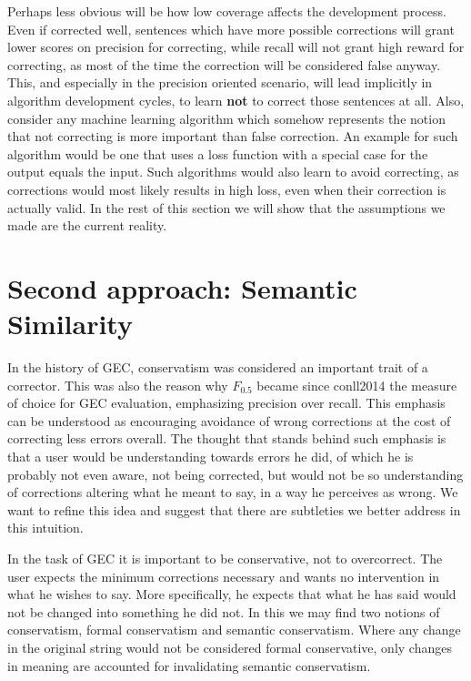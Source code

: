 \documentclass[english]{article}
\begin{document}
Perhaps less obvious will be how low coverage affects the development
process. Even if corrected well, sentences which have more possible
corrections will grant lower scores on precision for correcting, while recall will not grant high reward for correcting, as most of the time the correction will be considered false anyway. This, and especially in the precision oriented scenario, will lead implicitly in algorithm development cycles, to learn \textbf{not} to correct those sentences at all. Also, consider any machine learning algorithm which somehow represents the notion that not correcting is more important than false correction. An example for such algorithm would be one that uses a loss function with a special case for the output equals the input. Such algorithms would also learn to avoid correcting, as corrections would most likely results in high loss, even when their correction is actually valid.
In the rest of this section we will show that the assumptions we made are the current reality. 


\section{Second approach: Semantic Similarity\label{sec:Semantics}}

In the history of GEC, conservatism was considered an
important trait of a corrector\cite{brockett2006correcting}.
This was also the reason why $F_{0.5}$ became since conll2014\cite{ng2014conll}
the measure of choice for GEC evaluation, emphasizing
precision over recall. This emphasis can be understood as encouraging
avoidance of wrong corrections at the cost of correcting less errors
overall. The thought that stands behind such emphasis is that a user
would be understanding towards errors he did, of which he is probably
not even aware, not being corrected, but would not be so understanding
of corrections altering what he meant to say, in a way he perceives as wrong. We want to refine
this idea and suggest that there are subtleties we better address
in this intuition.

In the task of GEC it is important to be
conservative, not to overcorrect. The user expects the minimum corrections
necessary and wants no intervention in what he wishes to say. More
specifically, he expects that what he has said would not be changed
into something he did not. In this we may find two notions of conservatism,
formal conservatism and semantic conservatism. Where any change in
the original string would not be considered formal conservative, only
changes in meaning are accounted for invalidating semantic conservatism. 
\end{document}
